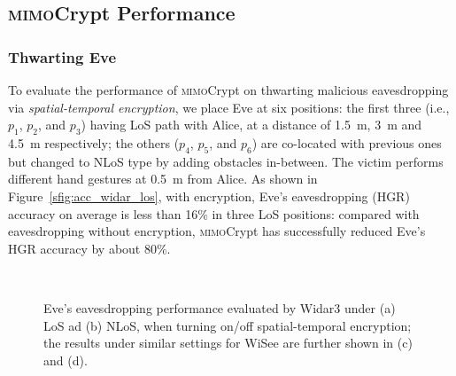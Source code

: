 \documentclass[conference,compsoc]{IEEEtran}
\newcommand{\sname}{\textsc{mimo}Crypt\xspace}
\newcommand{\rev}[1]{{\color{blue}#1}}      %
\newcommand{\rev}[1]{#1}
\begin{document}
\subsection{\sname Performance} \label{ssec:performance}

\subsubsection{Thwarting Eve}\label{sssec:scramblingPer}

To evaluate the performance of \sname on thwarting malicious eavesdropping via \rev{\textit{spatial-temporal encryption}}, we place Eve at six positions: the first three (i.e., $p_1$, $p_2$, and $p_3$) having LoS path with Alice, at a distance of 1.5~\!m, 3~\!m and 4.5~\!m respectively; the others ($p_4$, $p_5$, and $p_6$) are co-located with previous ones but changed to NLoS type by adding obstacles in-between. The victim performs different hand gestures at 0.5~\!m from Alice. As shown in Figure~\ref{sfig:acc_widar_los}, with encryption, Eve's eavesdropping (HGR) accuracy on average is less than 16\% in three LoS positions: compared with eavesdropping without encryption, \sname has successfully reduced Eve's HGR accuracy by about 80\%.
%
\begin{figure}[t]
	\setlength\abovecaptionskip{8pt}
	\vspace{-1.5ex}
	\centering
	\\ \vspace{-0.1ex}
	\caption{Eve's eavesdropping performance evaluated by Widar3 under (a) LoS ad (b) NLoS, when turning on/off spatial-temporal encryption; the results under similar settings for WiSee are further shown in (c) and (d).}
	\label{fig:overall_overall_scrambling}
    \vspace{-1.5ex}
\end{figure}
\end{document}
